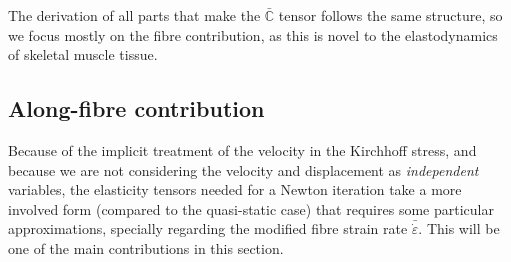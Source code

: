\documentclass{sfuthesis}
\numberwithin{equation}{section}
\numberwithin{figure}{chapter}
\numberwithin{table}{chapter}
\theoremstyle{definition}
\newcommand{\depsilon}{\dot{\varepsilon}}
\newcommand{\C}{\mathbb{C}}
\begin{document}
The derivation of all parts that make the $\bar{\C}$ tensor follows the same structure, so we focus mostly on the fibre contribution, as this is novel to the elastodynamics of skeletal muscle tissue. 

\subsection{Along-fibre contribution}

Because of the implicit treatment of the velocity in the Kirchhoff stress, and because we are not considering the velocity and displacement as \textit{independent} variables, the elasticity tensors needed for a Newton iteration take a more involved form (compared to the quasi-static case) that requires some particular approximations, specially regarding the modified fibre strain rate $\bar{\depsilon}$. This will be one of the main contributions in this section.
\end{document}
